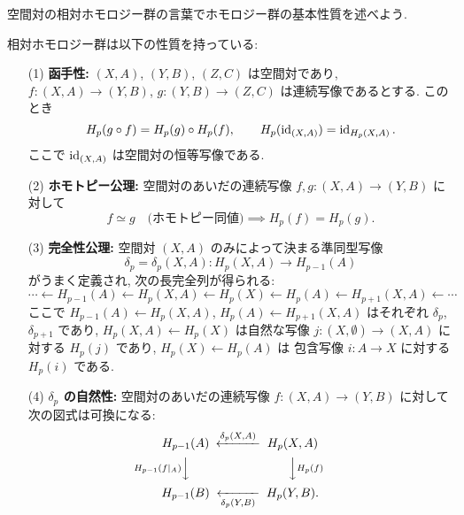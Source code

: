\documentclass[12pt,twoside]{jarticle}
\begin{document}
空間対の相対ホモロジー群の言葉でホモロジー群の基本性質を述べよう.

\begin{theorem}[相対ホモロジー群の基本性質]
 \label{theorem:homology-axioms}
 相対ホモロジー群は以下の性質を持っている:
 \begin{enumerate}
 \item[(1)] {\bf 函手性:}
  $(X,A)$, $(Y,B)$, $(Z,C)$ は空間対であり, 
  $f:(X,A)\to (Y,B)$, $g:(Y,B)\to (Z,C)$ は連続写像であるとする. このとき
  \begin{equation*}
   H_p(g\circ f) = H_p(g)\circ H_p(f),
   \qquad
   H_p(\mathop{\mathrm{id}}\nolimits_{(X,A)}) = \mathop{\mathrm{id}}\nolimits_{H_p(X,A)}.
  \end{equation*}
  ここで $\mathop{\mathrm{id}}\nolimits_{(X,A)}$ は空間対の恒等写像である.
  \item[(2)] {\bf ホモトピー公理:}
   空間対のあいだの連続写像 $f,g:(X,A)\to(Y,B)$ に対して
   \begin{equation*}
    f\simeq g \quad\text{(ホモトピー同値)}
     \implies H_p(f)=H_p(g).
   \end{equation*}
 \item[(3)] {\bf 完全性公理:}
  空間対 $(X,A)$ のみによって決まる準同型写像
  \begin{equation*}
   \delta_p = \delta_p(X,A) : H_p(X,A) \to H_{p-1}(A)
  \end{equation*}
  がうまく定義され, 次の長完全列が得られる:
  \begin{equation*}
      \cdots
      \leftarrow H_{p-1}(A)
      \leftarrow H_p(X,A)
      \leftarrow H_p(X)
      \leftarrow H_p(A)
      \leftarrow H_{p+1}(X,A)
      \leftarrow \cdots
  \end{equation*}
  ここで $H_{p-1}(A)\leftarrow H_p(X,A)$, $H_p(A)\leftarrow H_{p+1}(X,A)$ 
  はそれぞれ $\delta_p$, $\delta_{p+1}$ であり, 
  $H_p(X,A) \leftarrow H_p(X)$ は自然な写像 $j:(X,\emptyset)\to(X,A)$ に
  対する $H_p(j)$ であり, $H_p(X)\leftarrow H_p(A)$ は
  包含写像 $i:A\to X$ に対する $H_p(i)$ である.
 \item[(4)] {\bf $\delta_p$ の自然性:}
  空間対のあいだの連続写像 $f:(X,A)\to(Y,B)$ に対して次の図式は可換になる:
  \begin{equation*}
  \begin{CD}
    H_{p-1}(A) @<\delta_p(X,A)<< H_p(X,A) \\
    @V{H_{p-1}(f|_A)}VV  @VV{H_p(f)}V \\
    H_{p-1}(B) @<<\delta_p(Y,B)< H_p(Y,B). \\
  \end{CD}
  \end{equation*}

\end{enumerate}
\end{theorem}
\end{document}
